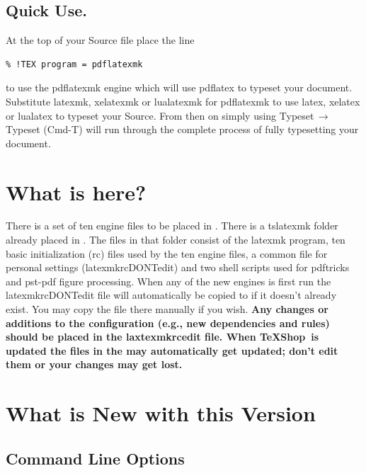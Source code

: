 \documentclass[11pt]{article}
\newcommand{\mnu}[1]{\textsf{#1}}
\newcommand{\cmd}[1]{\textsf{#1}}
\newcommand{\To}{\,\(\to\)\,}
\newcommand{\TS}{\textsf{\TeX Shop}}
\begin{document}
\subsection{Quick Use.}

At the top of your Source file place the line
\begin{verbatim}
% !TEX program = pdflatexmk
\end{verbatim}
to use the \cmd{pdflatexmk} engine which will use \cmd{pdflatex} to typeset your document. Substitute \cmd{latexmk}, \cmd{xelatexmk} or \cmd{lualatexmk} for \cmd{pdflatexmk} to use \cmd{latex}, \cmd{xelatex} or \cmd{lualatex} to typeset your Source. From then on simply using \mnu{Typeset}\To\mnu{Typeset} (\cmd{Cmd-T}) will run through the complete process of fully typesetting your document.

\section{What is here?}

There is a set of ten \cmd{engine} files to be placed in . There is a \cmd{tslatexmk} folder already placed in . The files in that folder consist of the \cmd{latexmk} program, ten basic initialization (\cmd{rc}) files used by the ten \cmd{engine} files, a common file for personal settings (\cmd{latexmkrcDONTedit}) and two shell scripts used for \cmd{pdftricks} and \cmd{pst-pdf} figure processing. When any of the new engines is first run the \cmd{latexmkrcDONTedit} file will automatically be copied to  if it doesn't already exist. You may copy the file there manually if you wish. \textbf{Any changes or additions to the configuration (e.g., new dependencies and rules) should be placed in the \cmd{laxtexmkrcedit} file. When \TS\ is updated the files in the  may automatically get updated; don't edit them or your changes may get lost.}

\section{What is New with this Version}

\subsection{Command Line Options}\label{sec:CLO}
\end{document}
